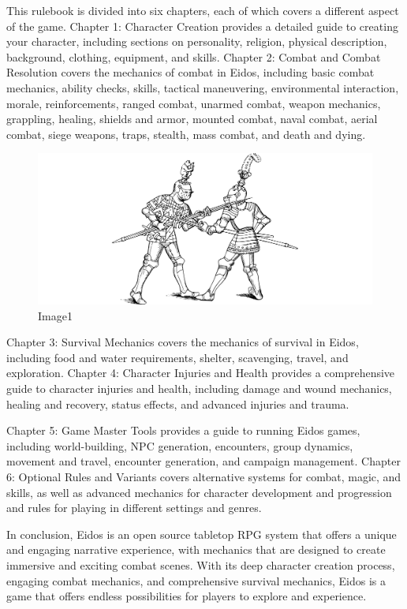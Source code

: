 This rulebook is divided into six chapters, each of which covers a
different aspect of the game. Chapter 1: Character Creation provides a
detailed guide to creating your character, including sections on
personality, religion, physical description, background, clothing,
equipment, and skills. Chapter 2: Combat and Combat Resolution covers
the mechanics of combat in Eidos, including basic combat mechanics,
ability checks, skills, tactical maneuvering, environmental interaction,
morale, reinforcements, ranged combat, unarmed combat, weapon mechanics,
grappling, healing, shields and armor, mounted combat, naval combat,
aerial combat, siege weapons, traps, stealth, mass combat, and death and
dying.

\begin{figure}
\centering
\includegraphics{./images/index02.pdf}
\caption{Image1}
\end{figure}

Chapter 3: Survival Mechanics covers the mechanics of survival in Eidos,
including food and water requirements, shelter, scavenging, travel, and
exploration. Chapter 4: Character Injuries and Health provides a
comprehensive guide to character injuries and health, including damage
and wound mechanics, healing and recovery, status effects, and advanced
injuries and trauma.

Chapter 5: Game Master Tools provides a guide to running Eidos games,
including world-building, NPC generation, encounters, group dynamics,
movement and travel, encounter generation, and campaign management.
Chapter 6: Optional Rules and Variants covers alternative systems for
combat, magic, and skills, as well as advanced mechanics for character
development and progression and rules for playing in different settings
and genres.

In conclusion, Eidos is an open source tabletop RPG system that offers a
unique and engaging narrative experience, with mechanics that are
designed to create immersive and exciting combat scenes. With its deep
character creation process, engaging combat mechanics, and comprehensive
survival mechanics, Eidos is a game that offers endless possibilities
for players to explore and experience.

